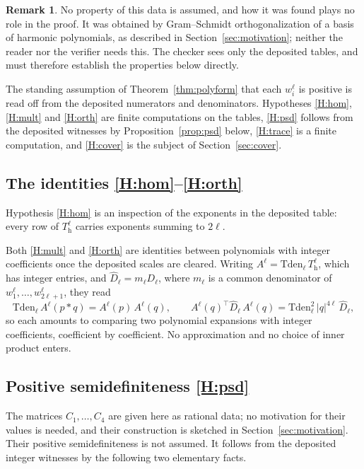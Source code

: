 \documentclass[reqno]{amsart}
\theoremstyle{definition}
\newtheorem{remark}[theorem]{Remark}
\begin{document}
\begin{remark}
No property of this data is assumed, and how it was found plays no role in the proof. It was
obtained by Gram--Schmidt orthogonalization of a basis of harmonic polynomials, as described in
Section~\ref{sec:motivation}; neither the reader nor the verifier needs this. The checker sees only
the deposited tables, and must therefore establish the properties below directly.
\end{remark}

The standing assumption of Theorem~\ref{thm:polyform} that each $w^\ell_i$ is positive is read off
from the deposited numerators and denominators. Hypotheses \ref{H:hom}, \ref{H:mult} and
\ref{H:orth} are finite computations on the tables, \ref{H:psd} follows from the deposited
witnesses by Proposition~\ref{prop:psd} below, \ref{H:trace} is a finite computation, and
\ref{H:cover} is the subject of Section~\ref{sec:cover}.

\subsection{The identities \ref{H:hom}--\ref{H:orth}}\label{subsec:maps}

Hypothesis \ref{H:hom} is an inspection of the exponents in the deposited table: every row of
$T^\ell_{\mathrm h}$ carries exponents summing to $2\ell$.

Both \ref{H:mult} and \ref{H:orth} are identities between polynomials with integer coefficients
once the deposited scales are cleared. Writing
$A^\ell=\mathrm{Tden}_\ell\,T^\ell_{\mathrm h}$, which has integer entries, and
$\widehat D_\ell=m_\ell D_\ell$, where $m_\ell$ is a common denominator of
$w^\ell_1,\dots,w^\ell_{2\ell+1}$, they read
\[
\mathrm{Tden}_\ell\,A^\ell(p*q)=A^\ell(p)\,A^\ell(q),
\qquad
A^\ell(q)^\top \widehat D_\ell\,A^\ell(q)=\mathrm{Tden}_\ell^{2}\,|q|^{4\ell}\,\widehat D_\ell ,
\]
so each amounts to comparing two polynomial expansions with integer coefficients, coefficient by
coefficient. No approximation and no choice of inner product enters.

\subsection{Positive semidefiniteness \ref{H:psd}}\label{subsec:C}

The matrices $C_1,\dots,C_4$ are given here as rational data; no motivation for their values is
needed, and their construction is sketched in Section~\ref{sec:motivation}. Their positive
semidefiniteness is not assumed. It follows from the deposited integer witnesses by the following
two elementary facts.
\end{document}
